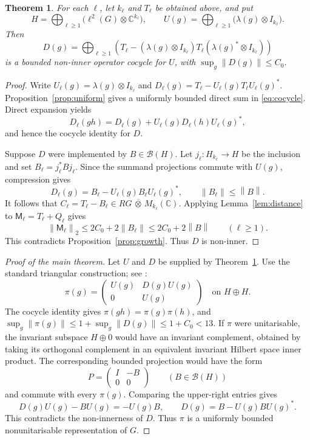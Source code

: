 \documentclass[a4paper,11pt]{amsproc}
\numberwithin{equation}{section}
\newtheorem{theorem}{Theorem}[section]
\theoremstyle{definition}
\newcommand{\C}{\mathbb C}
\newcommand{\cB}{\mathcal B}
\newcommand{\norm}[1]{\left\lVert#1\right\rVert}
\begin{document}
\begin{theorem}\label{thm:cocycle}
For each $\ell$, let $k_\ell$ and $T_\ell$ be obtained above, and put
\begin{equation}\label{eq:direct-sum}
 H=\bigoplus_{\ell\ge1}\bigl(\ell^2(G)\otimes\C^{k_\ell}\bigr),\qquad
 U(g)=\bigoplus_{\ell\ge1}\bigl(\lambda(g)\otimes I_{k_\ell}\bigr).
\end{equation}
Then
\begin{equation}\label{eq:cocycle}
 D(g)=\bigoplus_{\ell\ge1}
 \left(T_\ell-(\lambda(g)\otimes I_{k_\ell})T_\ell
                   (\lambda(g)^*\otimes I_{k_\ell})\right)
\end{equation}
is a bounded non-inner operator cocycle for $U$, with $\sup_g\norm{D(g)}\le C_0$.
\end{theorem}
\begin{proof}
Write $U_\ell(g)=\lambda(g)\otimes I_{k_\ell}$ and
$D_\ell(g)=T_\ell-U_\ell(g)T_\ell U_\ell(g)^*$. Proposition~\ref{prop:uniform} gives a uniformly bounded direct sum in \eqref{eq:cocycle}. Direct expansion yields
\[
 D_\ell(gh)=D_\ell(g)+U_\ell(g)D_\ell(h)U_\ell(g)^*,
\]
and hence the cocycle identity for $D$.

Suppose $D$ were implemented by $B\in\cB(H)$. Let $j_\ell:H_{k_\ell}\to H$ be the inclusion and set $B_\ell=j_\ell^*Bj_\ell$. Since the summand projections commute with $U(g)$, compression gives
\[
 D_\ell(g)=B_\ell-U_\ell(g)B_\ell U_\ell(g)^*,\qquad
 \norm{B_\ell}\le\norm{B}.
\]
It follows that $C_\ell=T_\ell-B_\ell\in RG\,\overline\otimes\,M_{k_\ell}(\C)$. Applying Lemma~\ref{lem:distance} to $\mathsf M_\ell=T_\ell+Q_\ell$ gives
\[
 \norm{\mathsf M_\ell}_2\le2C_0+2\norm{B_\ell}\le2C_0+2\norm{B}
 \qquad(\ell\ge1).
\]
This contradicts Proposition~\ref{prop:growth}. Thus $D$ is non-inner.
\end{proof}

\begin{proof}[Proof of the main theorem]
Let $U$ and $D$ be supplied by Theorem~\ref{thm:cocycle}. Use the standard triangular construction; see \cite[\S\,2]{mo}:
\begin{equation}\label{eq:triangular}
 \pi(g)=
 \begin{pmatrix}
 U(g)&D(g)U(g)\\
 0&U(g)
 \end{pmatrix}
 \quad\text{on }H\oplus H.
\end{equation}
The cocycle identity gives $\pi(gh)=\pi(g)\pi(h)$, and
$\sup_g\norm{\pi(g)}\le1+\sup_g\norm{D(g)}\le1+C_0<13$.
If $\pi$ were unitarisable, the invariant subspace $H\oplus0$ would have an invariant complement, obtained by taking its orthogonal complement in an equivalent invariant Hilbert space inner product. The corresponding bounded projection would have the form
\[
 P=\begin{pmatrix}I&-B\\0&0\end{pmatrix}
 \qquad(B\in\cB(H))
\]
and commute with every $\pi(g)$. Comparing the upper-right entries gives
\[
 D(g)U(g)-BU(g)=-U(g)B,
 \qquad D(g)=B-U(g)BU(g)^*.
\]
This contradicts the non-innerness of $D$. Thus $\pi$ is a uniformly bounded nonunitarisable representation of $G$.
\end{proof}
\end{document}

